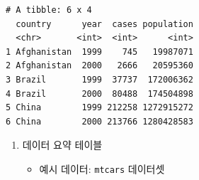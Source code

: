 \documentclass[
  11pt,
]{krantz}
\newenvironment{Shaded}{\begin{snugshade}}{\end{snugshade}}
\newcommand{\CommentTok}[1]{\textcolor[rgb]{0.37,0.37,0.37}{\textit{#1}}}
\newcommand{\DataTypeTok}[1]{\textcolor[rgb]{0.27,0.27,0.27}{#1}}
\newcommand{\KeywordTok}[1]{\textcolor[rgb]{0.27,0.27,0.27}{\textbf{#1}}}
\newcommand{\NormalTok}[1]{#1}
\newcommand{\OperatorTok}[1]{\textcolor[rgb]{0.43,0.43,0.43}{\textbf{#1}}}
\newcommand{\StringTok}[1]{\textcolor[rgb]{0.5,0.5,0.5}{#1}}
\providecommand{\tightlist}{%
  \setlength{\itemsep}{0pt}\setlength{\parskip}{0pt}}
\begin{document}
\begin{Shaded}
\end{Shaded}

\begin{verbatim}
# A tibble: 6 x 4
  country      year  cases population
  <chr>       <int>  <int>      <int>
1 Afghanistan  1999    745   19987071
2 Afghanistan  2000   2666   20595360
3 Brazil       1999  37737  172006362
4 Brazil       2000  80488  174504898
5 China        1999 212258 1272915272
6 China        2000 213766 1280428583
\end{verbatim}

\normalsize

\begin{enumerate}
\def\labelenumi{\arabic{enumi}.}
\setcounter{enumi}{2}
\tightlist
\item
  데이터 요약 테이블

  \begin{itemize}
  \tightlist
  \item
    예시 데이터: \texttt{mtcars} 데이터셋
  \end{itemize}
\end{enumerate}

\footnotesize
\end{document}
